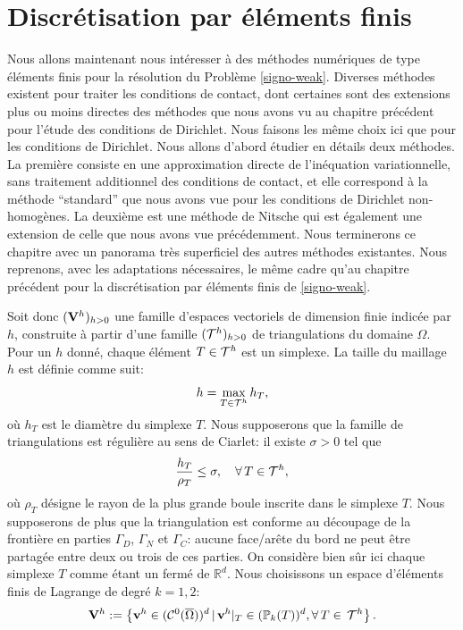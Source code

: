 \documentclass[11pt]{book}
\def\vv{{\bf v}}
\def\V{{\bf V}}
\newcommand{\caC}{{\cal C}}
\newcommand{\R}{\mathbb{R}}
\newcommand{\PP}{\mathbb{P}}
\begin{document}
\section{Discrétisation par éléments finis}

Nous allons maintenant nous intéresser à des méthodes numériques de type éléments finis pour la résolution du Problème \eqref{signo-weak}. Diverses méthodes existent pour traiter les conditions de contact, dont certaines sont des extensions plus ou moins directes des méthodes que nous avons vu au chapitre précédent pour l'étude des conditions de Dirichlet. Nous faisons les même choix ici que pour les conditions de Dirichlet. Nous allons d'abord étudier en détails deux méthodes. La première consiste en une approximation directe de l'inéquation variationnelle, sans traitement additionnel des conditions de contact, et elle correspond à la méthode ``standard'' que nous avons vue pour les conditions de Dirichlet non-homogènes. La deuxième est une méthode de Nitsche qui est également une extension de celle que nous avons vue précédemment. Nous terminerons ce chapitre avec un panorama très superficiel des autres méthodes existantes.
Nous reprenons, avec les adaptations nécessaires, le même cadre qu'au chapitre précédent pour la discrétisation par éléments finis de \eqref{signo-weak}.

Soit donc $(\V^h)_{h>0}$ une famille d'espaces vectoriels de dimension finie
 \cite{ciarlet-91, ern-guermond-04, brenner-scott-07} indicée par $h$, construite à partir d'une famille $({\cal  T}^h)_{h>0}$ de triangulations du domaine $\Omega$. Pour un $h$ donné, chaque élément $T \in {\cal T}^h$ est un simplexe. %
La taille du maillage $h$ est définie comme suit: 
$$h = \max_{T \in  {\cal T}^h} h_T,$$
où $h_T$ est le diamètre du simplexe $T$. 
Nous supposerons que la famille de triangulations est régulière au sens de Ciarlet:
il existe $\sigma>0$ tel que 
$$\frac{h_T}{\rho_T} \le \sigma, \quad \forall \, T \in {\cal T}^h,$$
où $\rho_T$ désigne le rayon de la plus grande boule inscrite dans le simplexe $T$.
Nous supposerons de plus que la triangulation est conforme au découpage de la frontière en parties $\Gamma_D$, $\Gamma_N$ et $\Gamma_C$: aucune face/arête du bord ne peut être partagée entre deux ou trois de ces parties.
On considère bien sûr ici chaque simplexe $T$ comme étant un fermé de $\R^d$.
Nous choisissons un espace d'éléments finis de Lagrange de degré  $k=1,2$:
\begin{equation} \label{defvvh}
\V^h := \left\{ \vv^h \in (\caC^0(\overline\Omega))^d \, | \,
 \vv^h|_{T} \in (\PP_k (T))^d, \forall \,T \in \,{\cal T}^h
\right\}.
\end{equation}
\end{document}

